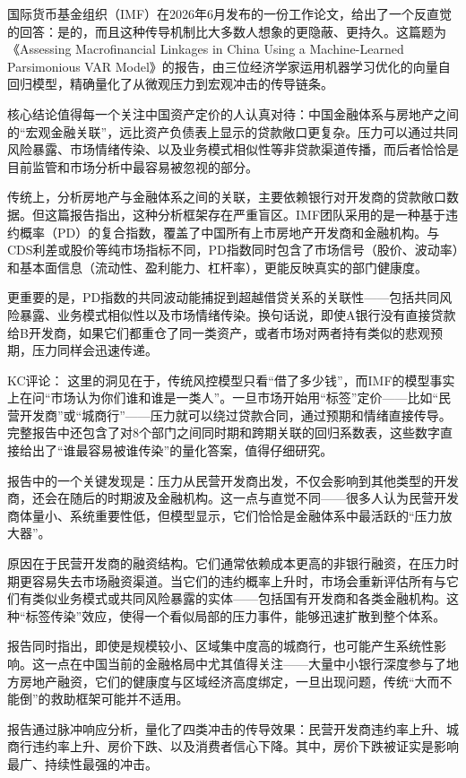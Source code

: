 \documentclass[11pt]{ctexart}
\begin{document}
国际货币基金组织（IMF）在2026年6月发布的一份工作论文，给出了一个反直觉的回答：是的，而且这种传导机制比大多数人想象的更隐蔽、更持久。这篇题为《Assessing Macrofinancial Linkages in China Using a Machine-Learned Parsimonious VAR Model》的报告，由三位经济学家运用机器学习优化的向量自回归模型，精确量化了从微观压力到宏观冲击的传导链条。

核心结论值得每一个关注中国资产定价的人认真对待：中国金融体系与房地产之间的“宏观金融关联”，远比资产负债表上显示的贷款敞口更复杂。压力可以通过共同风险暴露、市场情绪传染、以及业务模式相似性等非贷款渠道传播，而后者恰恰是目前监管和市场分析中最容易被忽视的部分。

传统上，分析房地产与金融体系之间的关联，主要依赖银行对开发商的贷款敞口数据。但这篇报告指出，这种分析框架存在严重盲区。IMF团队采用的是一种基于违约概率（PD）的复合指数，覆盖了中国所有上市房地产开发商和金融机构。与CDS利差或股价等纯市场指标不同，PD指数同时包含了市场信号（股价、波动率）和基本面信息（流动性、盈利能力、杠杆率），更能反映真实的部门健康度。

更重要的是，PD指数的共同波动能捕捉到超越借贷关系的关联性——包括共同风险暴露、业务模式相似性以及市场情绪传染。换句话说，即使A银行没有直接贷款给B开发商，如果它们都重仓了同一类资产，或者市场对两者持有类似的悲观预期，压力同样会迅速传递。

KC评论： 这里的洞见在于，传统风控模型只看“借了多少钱”，而IMF的模型事实上在问“市场认为你们谁和谁是一类人”。一旦市场开始用“标签”定价——比如“民营开发商”或“城商行”——压力就可以绕过贷款合同，通过预期和情绪直接传导。完整报告中还包含了对8个部门之间同时期和跨期关联的回归系数表，这些数字直接给出了“谁最容易被谁传染”的量化答案，值得仔细研究。

报告中的一个关键发现是：压力从民营开发商出发，不仅会影响到其他类型的开发商，还会在随后的时期波及金融机构。这一点与直觉不同——很多人认为民营开发商体量小、系统重要性低，但模型显示，它们恰恰是金融体系中最活跃的“压力放大器”。

原因在于民营开发商的融资结构。它们通常依赖成本更高的非银行融资，在压力时期更容易失去市场融资渠道。当它们的违约概率上升时，市场会重新评估所有与它们有类似业务模式或共同风险暴露的实体——包括国有开发商和各类金融机构。这种“标签传染”效应，使得一个看似局部的压力事件，能够迅速扩散到整个体系。

报告同时指出，即使是规模较小、区域集中度高的城商行，也可能产生系统性影响。这一点在中国当前的金融格局中尤其值得关注——大量中小银行深度参与了地方房地产融资，它们的健康度与区域经济高度绑定，一旦出现问题，传统“大而不能倒”的救助框架可能并不适用。

报告通过脉冲响应分析，量化了四类冲击的传导效果：民营开发商违约率上升、城商行违约率上升、房价下跌、以及消费者信心下降。其中，房价下跌被证实是影响最广、持续性最强的冲击。
\end{document}
